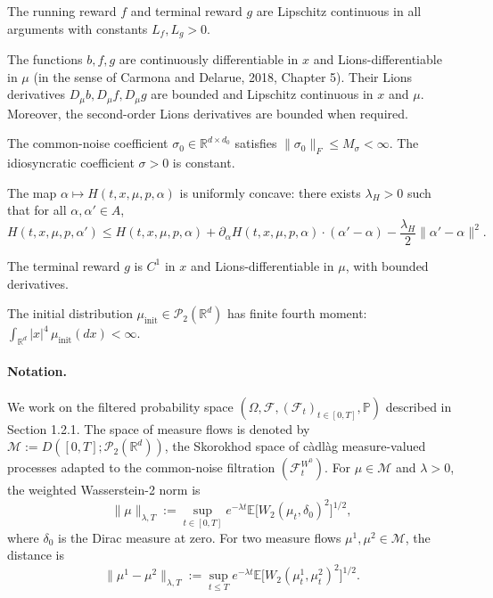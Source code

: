 \begin{assumption}
The running reward $f$ and terminal reward $g$ are Lipschitz continuous in all
arguments with constants $L_f, L_g > 0$.
\end{assumption}

\begin{assumption}
\label{ass:wp-regularity}
The functions $b, f, g$ are continuously differentiable in $x$ and Lions-differentiable
in $\mu$ (in the sense of Carmona and Delarue, 2018, Chapter 5). Their Lions derivatives
$D_\mu b, D_\mu f, D_\mu g$ are bounded and Lipschitz continuous in $x$ and $\mu$.
Moreover, the second-order Lions derivatives are bounded when required.
\end{assumption}

\begin{assumption}
The common-noise coefficient $\sigma_0 \in \mathbb{R}^{d \times d_0}$ satisfies
$\|\sigma_0\|_F \leq M_\sigma < \infty$. The idiosyncratic coefficient $\sigma > 0$ is
constant.
\end{assumption}

\begin{assumption}
The map $\alpha \mapsto H(t,x,\mu,p,\alpha)$ is uniformly concave: there exists
$\lambda_H > 0$ such that for all $\alpha, \alpha' \in A$,
\[
    H(t,x,\mu,p,\alpha') \leq H(t,x,\mu,p,\alpha) + \partial_\alpha H(t,x,\mu,p,\alpha)
    \cdot (\alpha' - \alpha) - \frac{\lambda_H}{2}\|\alpha' - \alpha\|^2.
\]
\end{assumption}

\begin{assumption}
The terminal reward $g$ is $C^1$ in $x$ and Lions-differentiable in $\mu$, with bounded
derivatives.
\end{assumption}

\begin{assumption}
The initial distribution $\mu_{\mathrm{init}} \in \mathcal{P}_2(\mathbb{R}^d)$ has
finite fourth moment: $\int_{\mathbb{R}^d} |x|^4\, \mu_{\mathrm{init}}(dx) < \infty$.
\end{assumption}

\paragraph{Notation.} We work on the filtered probability space
$(\Omega, \mathcal{F}, (\mathcal{F}_t)_{t \in [0,T]}, \mathbb{P})$ described in Section
1.2.1. The space of measure flows is denoted by
$\mathcal{M} := D([0,T]; \mathcal{P}_2(\mathbb{R}^d))$, the Skorokhod space of
c\`adl\`ag measure-valued processes adapted to the common-noise filtration
$(\mathcal{F}_t^{W^0})$. For $\mu \in \mathcal{M}$ and $\lambda > 0$, the weighted
Wasserstein-2 norm is
\[
    \|\mu\|_{\lambda,T} := \sup_{t \in [0,T]} e^{-\lambda t}
    \mathbb{E}\big[W_2(\mu_t, \delta_0)^2\big]^{1/2},
\]
where $\delta_0$ is the Dirac measure at zero. For two measure flows
$\mu^1, \mu^2 \in \mathcal{M}$, the distance is
\[
    \|\mu^1 - \mu^2\|_{\lambda,T} := \sup_{t \leq T} e^{-\lambda t}
    \mathbb{E}\big[W_2(\mu_t^1, \mu_t^2)^2\big]^{1/2}.
\]

